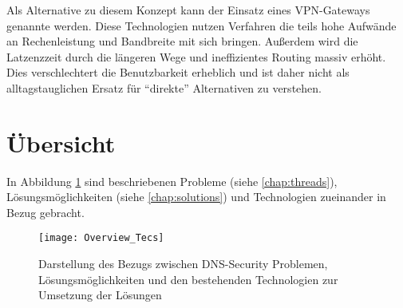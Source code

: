 Als Alternative zu diesem Konzept kann der Einsatz eines VPN-Gateways genannte werden. Diese Technologien nutzen Verfahren die teils hohe Aufwände an Rechenleistung und Bandbreite mit sich bringen. Außerdem wird die Latzenzzeit durch die längeren Wege und ineffizientes Routing massiv erhöht. Dies verschlechtert die Benutzbarkeit erheblich und ist daher nicht als alltagstauglichen Ersatz für ``direkte'' Alternativen zu verstehen.      

\section{Übersicht}
In Abbildung \ref{img:technologies-summary} sind beschriebenen Probleme (siehe \ref{chap:threads}), Lösungsmöglichkeiten (siehe \ref{chap:solutions}) und Technologien zueinander in Bezug gebracht.

\begin{figure}[!hb]
    \centering
    \texttt{[image: Overview\_Tecs]}
    \caption{Darstellung des Bezugs zwischen DNS-Security Problemen, Lösungsmöglichkeiten und den bestehenden Technologien zur Umsetzung der Lösungen}
    \label{img:technologies-summary}
\end{figure}